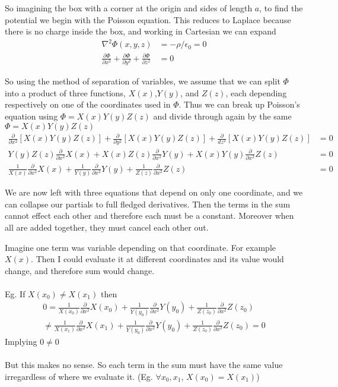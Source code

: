 \documentclass{article}
\begin{document}
So imagining the box with a corner at the origin and sides of length $a$, to find the potential we begin with the Poisson equation. This reduces to Laplace because there is no charge inside the box, and working in Cartesian we can expand
\begin{align*}
\nabla^{2}\Phi(x,y,z) &= -\rho/\epsilon_{0} = 0\\
\frac{\partial\Phi}{\partial x^{2}} + \frac{\partial\Phi}{\partial y^{2}} + \frac{\partial\Phi}{\partial z^{2}} &= 0
\end{align*}

So using the method of separation of variables, we assume that we can split $\Phi$ into a product of three functions, $X(x)$,$Y(y)$, and $Z(z)$, each depending respectively on one of the coordinates used in $\Phi$. Thus we can break up Poisson's equation using $\Phi=X(x)Y(y)Z(z)$ and divide through again by the same $\Phi=X(x)Y(y)Z(z)$
\begin{align*}
\frac{\partial}{\partial x^{2}}\left[X(x)Y(y)Z(z)\right] + \frac{\partial}{\partial y^{2}}\left[X(x)Y(y)Z(z)\right] + \frac{\partial}{dz^{2}}\left[X(x)Y(y)Z(z)\right] &= 0\\
Y(y)Z(z)\frac{\partial}{\partial x^{2}}X(x) + X(x)Z(z)\frac{\partial}{\partial x^{2}}Y(y) + X(x)Y(y)\frac{\partial}{\partial x^{2}}Z(z) &= 0\\
\frac{1}{X(x)}\frac{\partial}{\partial x^{2}}X(x) + \frac{1}{Y(y)}\frac{\partial}{\partial x^{2}}Y(y) + \frac{1}{Z(z)}\frac{\partial}{\partial x^{2}}Z(z) &= 0
\end{align*}

We are now left with three equations that depend on only one coordinate, and we can collapse our partials to full fledged derivatives. Then the terms in the sum cannot effect each other and therefore each must be a constant. Moreover when all are added together, they must cancel each other out.

Imagine one term was variable depending on that coordinate. For example $X(x)$. Then I could evaluate it at different coordinates and its value would change, and therefore sum would change.\\
\\
Eg. If $X(x_{0})\ne X(x_{1})$ then 
\begin{multline*}
0 = \frac{1}{X(x_{0})}\frac{\partial}{\partial x^{2}}X(x_{0}) + \frac{1}{Y(y_{0})}\frac{\partial}{\partial x^{2}}Y(y_{0}) + \frac{1}{Z(z_{0})}\frac{\partial}{\partial x^{2}}Z(z_{0})\\
\ne \frac{1}{X(x_{1})}\frac{\partial}{\partial x^{2}}X(x_{1}) + \frac{1}{Y(y_{0})}\frac{\partial}{\partial x^{2}}Y(y_{0}) + \frac{1}{Z(z_{0})}\frac{\partial}{\partial x^{2}}Z(z_{0}) = 0
\end{multline*}
Implying $0\ne0$\\
\\
But this makes no sense. So each term in the sum must have the same value irregardless of where we evaluate it. (Eg. $\forall x_{0},x_{1}$, $X(x_{0})=X(x_{1})$)
\end{document}
